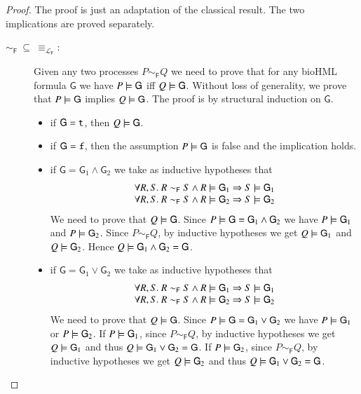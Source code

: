  \theocorr*
 \begin{proof}
The proof is just an adaptation of the classical result. The two implications are proved separately.
\begin{description}
\item[$\sim_{\mathsf{F}}\ \subseteq\ \equiv_{\mathcal{L}_{\mathsf{F}}}$:]
Given any two processes $P\sim_{\mathsf{F}} Q$ we need to prove that for any bioHML formula $\mathsf{G}$ we have $P\models \mathsf{G}$ iff $Q\models \mathsf{G}$. 
Without loss of generality, we prove that $P\models \mathsf{G}$ implies $Q\models \mathsf{G}$.
The proof is by structural induction on $\mathsf{G}$.
\begin{itemize}
\item 
if $\mathsf{G}={\tt t}$, then $Q\models \mathsf{G}$.

\item
if $\mathsf{G}={\tt f}$, then the assumption $P\models \mathsf{G}$ is false and the implication holds.

\item
if $\mathsf{G}=\mathsf{G}_1 \wedge \mathsf{G}_2$ we take as inductive hypotheses that
$$
\begin{array}{l}
\forall R,S.\ R \sim_{\mathsf{F}} S \wedge R\models \mathsf{G}_1 \Rightarrow S \models \mathsf{G}_1\\
\forall R,S.\ R \sim_{\mathsf{F}} S \wedge R\models \mathsf{G}_2 \Rightarrow S \models \mathsf{G}_2
\end{array}
$$
We need to prove that $Q\models \mathsf{G}$.
Since $P\models \mathsf{G}=\mathsf{G}_1 \wedge \mathsf{G}_2$ we have $P\models \mathsf{G}_1$ and $P\models \mathsf{G}_2$.
Since $P\sim_{\mathsf{F}} Q$, by inductive hypotheses we get $Q\models \mathsf{G}_1$ and $Q\models \mathsf{G}_2$.
Hence $Q\models \mathsf{G}_1 \wedge \mathsf{G}_2=\mathsf{G}$.


\item
if $\mathsf{G}=\mathsf{G}_1 \vee \mathsf{G}_2$  we take as inductive hypotheses that
$$
\begin{array}{l}
\forall R,S.\ R \sim_{\mathsf{F}} S \wedge R\models \mathsf{G}_1 \Rightarrow S \models \mathsf{G}_1\\
\forall R,S.\ R \sim_{\mathsf{F}} S \wedge R\models \mathsf{G}_2 \Rightarrow S \models \mathsf{G}_2
\end{array}
$$
We need to prove that $Q\models \mathsf{G}$.
Since $P\models \mathsf{G}=\mathsf{G}_1 \vee \mathsf{G}_2$ we have $P\models \mathsf{G}_1$ or $P\models \mathsf{G}_2$.
If $P\models \mathsf{G}_1$, since $P\sim_{\mathsf{F}} Q$, by inductive hypotheses we get $Q\models \mathsf{G}_1$ and thus $Q\models \mathsf{G}_1 \vee \mathsf{G}_2=\mathsf{G}$.
If $P\models \mathsf{G}_2$, since $P\sim_{\mathsf{F}} Q$, by inductive hypotheses we get $Q\models \mathsf{G}_2$ and thus $Q\models \mathsf{G}_1 \vee \mathsf{G}_2=\mathsf{G}$.


\end{itemize}
\end{description}
\end{proof}

